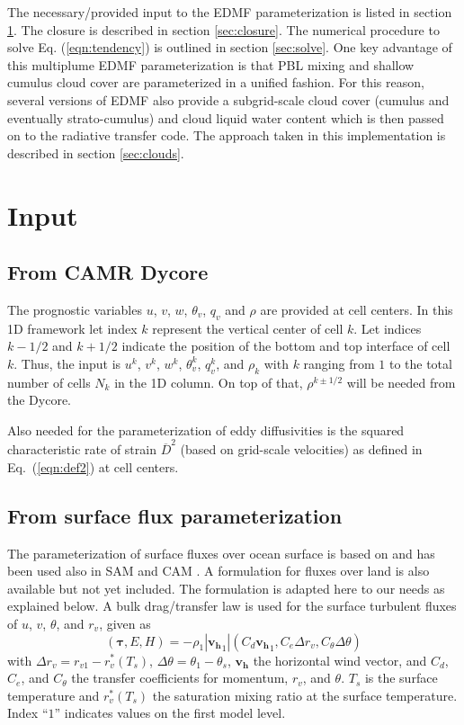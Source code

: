 \documentclass[dvipdfmx,a4paper,10pt]{article}
\begin{document}
The necessary/provided input to the EDMF parameterization is listed in section \ref{sec:input}. The closure is described in section \ref{sec:closure}. The numerical procedure to solve Eq. (\ref{eqn:tendency}) is outlined in section \ref{sec:solve}. One key advantage of this multiplume EDMF parameterization is that PBL mixing and shallow cumulus cloud cover are parameterized in a unified fashion. For this reason, several versions of EDMF also provide a subgrid-scale cloud cover (cumulus and eventually strato-cumulus) and cloud liquid water content which is then passed on to the radiative transfer code. The approach taken in this implementation is described in section \ref{sec:clouds}.

\section{Input}\label{sec:input}

\subsection{From CAMR Dycore}

The prognostic variables $u$, $v$, $w$, $\theta_v$, $q_v$ and $\rho$ are provided at cell centers. In this 1D framework let index $k$ represent the vertical center of cell $k$. Let indices $k-1/2$ and $k+1/2$ indicate the position of the bottom and top interface of cell $k$. Thus, the input is $u^k$, $v^k$, $w^k$, $\theta_v^k$, $q_v^k$, and $\rho_k$ with $k$ ranging from $1$ to the total number of cells $N_k$ in the 1D column. On top of that, $\rho^{k\pm 1/2}$ will be needed from the Dycore. 

Also needed for the parameterization of eddy diffusivities is the squared characteristic rate of strain $\overline{D}^2$ (based on grid-scale velocities) as defined in Eq.~(\ref{eqn:def2}) at cell centers. 

\subsection{From surface flux parameterization}\label{sec:sfcfluxes}

The parameterization of surface fluxes over ocean surface is based on \cite{bryan03} and has been used also in SAM \citep{khairou03} and CAM \citep[see][section 4.10.2]{collins04}. A formulation for fluxes over land is also available but not yet included. The formulation is adapted here to our needs as explained below. A bulk drag/transfer law is used for the surface turbulent fluxes of $u$, $v$, $\theta$, and $r_v$, given as
\begin{equation}\label{eqn:fluxes}
 (\mathbf{\tau}, E, H)=-\rho_1|\mathbf{v_h}_1| (C_d \mathbf{v_h}_1, C_e \Delta r_v, C_{\theta} \Delta \theta )
\end{equation}
with $\Delta r_v=r_{v1}-r_v^*(T_s)$, $\Delta \theta=\theta_{1}-\theta_{s}$, $\mathbf{v_h}$ the horizontal wind vector, and $C_d$, $C_e$, and $C_{\theta}$ the transfer coefficients for momentum, $r_v$, and $\theta$. $T_s$ is the surface temperature and $r_v^*(T_s)$ the saturation mixing ratio at the surface temperature. Index ``$1$'' indicates values on the first model level. 
\end{document}
